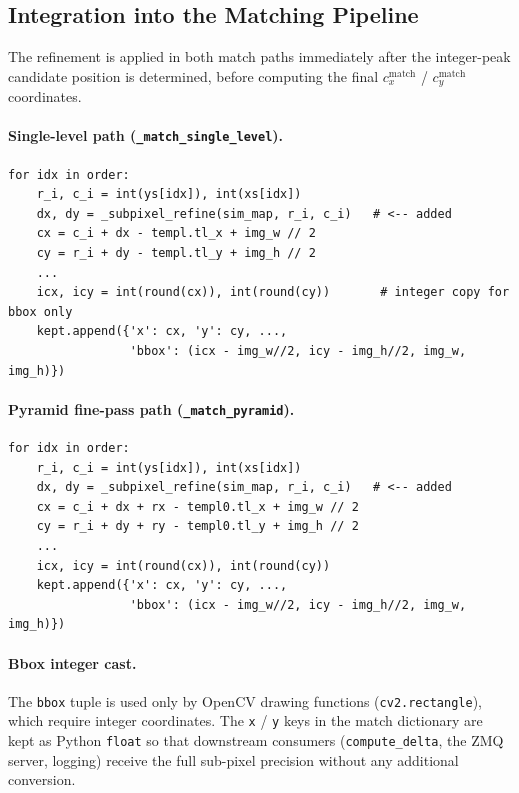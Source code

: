 \documentclass[12pt,a4paper]{article}
\begin{document}
\subsection{Integration into the Matching Pipeline}

The refinement is applied in both match paths immediately after the
integer-peak candidate position is determined, before computing the
final $c_x^\text{match}$ / $c_y^\text{match}$ coordinates.

\paragraph{Single-level path (\texttt{\_match\_single\_level}).}
\begin{lstlisting}[style=python,
  caption={Refinement call in the single-level scoring loop},
  label={lst:refine_single}]
for idx in order:
    r_i, c_i = int(ys[idx]), int(xs[idx])
    dx, dy = _subpixel_refine(sim_map, r_i, c_i)   # <-- added
    cx = c_i + dx - templ.tl_x + img_w // 2
    cy = r_i + dy - templ.tl_y + img_h // 2
    ...
    icx, icy = int(round(cx)), int(round(cy))       # integer copy for bbox only
    kept.append({'x': cx, 'y': cy, ...,
                 'bbox': (icx - img_w//2, icy - img_h//2, img_w, img_h)})
\end{lstlisting}

\paragraph{Pyramid fine-pass path (\texttt{\_match\_pyramid}).}
\begin{lstlisting}[style=python,
  caption={Refinement call in the pyramid fine-pass scoring loop},
  label={lst:refine_pyramid}]
for idx in order:
    r_i, c_i = int(ys[idx]), int(xs[idx])
    dx, dy = _subpixel_refine(sim_map, r_i, c_i)   # <-- added
    cx = c_i + dx + rx - templ0.tl_x + img_w // 2
    cy = r_i + dy + ry - templ0.tl_y + img_h // 2
    ...
    icx, icy = int(round(cx)), int(round(cy))
    kept.append({'x': cx, 'y': cy, ...,
                 'bbox': (icx - img_w//2, icy - img_h//2, img_w, img_h)})
\end{lstlisting}

\paragraph{Bbox integer cast.}
The \texttt{bbox} tuple is used only by OpenCV drawing functions
(\texttt{cv2.rectangle}), which require integer coordinates.
The \texttt{x} / \texttt{y} keys in the match dictionary are kept as
Python \texttt{float} so that downstream consumers (\texttt{compute\_delta},
the ZMQ server, logging) receive the full sub-pixel precision without any
additional conversion.
\end{document}
